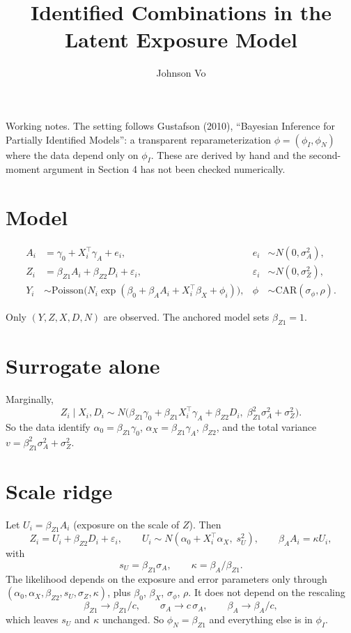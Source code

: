 \documentclass[11pt]{article}
\title{Identified Combinations in the Latent Exposure Model}
\author{Johnson Vo}
\date{}
\begin{document}
\maketitle

Working notes. The setting follows Gustafson (2010), ``Bayesian Inference for Partially Identified Models'': a transparent reparameterization $\phi = (\phi_I, \phi_N)$ where the data depend only on $\phi_I$. These are derived by hand and the second-moment argument in Section 4 has not been checked numerically.

\section{Model}

\begin{align*}
A_i &= \gamma_0 + X_i^\top \gamma_A + e_i, & e_i &\sim N(0, \sigma_A^2),\\
Z_i &= \beta_{Z1} A_i + \beta_{Z2} D_i + \varepsilon_i, & \varepsilon_i &\sim N(0, \sigma_Z^2),\\
Y_i &\sim \text{Poisson}\big(N_i \exp(\beta_0 + \beta_A A_i + X_i^\top \beta_X + \phi_i)\big), & \phi &\sim \text{CAR}(\sigma_\phi, \rho).
\end{align*}

Only $(Y, Z, X, D, N)$ are observed. The anchored model sets $\beta_{Z1} = 1$.

\section{Surrogate alone}

Marginally,
\[
Z_i \mid X_i, D_i \sim N\big(\beta_{Z1}\gamma_0 + \beta_{Z1} X_i^\top \gamma_A + \beta_{Z2} D_i,\; \beta_{Z1}^2 \sigma_A^2 + \sigma_Z^2\big).
\]
So the data identify $\alpha_0 = \beta_{Z1}\gamma_0$, $\alpha_X = \beta_{Z1}\gamma_A$, $\beta_{Z2}$, and the total variance $v = \beta_{Z1}^2\sigma_A^2 + \sigma_Z^2$.

\section{Scale ridge}

Let $U_i = \beta_{Z1} A_i$ (exposure on the scale of $Z$). Then
\[
Z_i = U_i + \beta_{Z2} D_i + \varepsilon_i, \qquad U_i \sim N(\alpha_0 + X_i^\top \alpha_X,\; s_U^2), \qquad \beta_A A_i = \kappa U_i,
\]
with
\[
s_U = \beta_{Z1}\sigma_A, \qquad \kappa = \beta_A / \beta_{Z1}.
\]
The likelihood depends on the exposure and error parameters only through $(\alpha_0, \alpha_X, \beta_{Z2}, s_U, \sigma_Z, \kappa)$, plus $\beta_0$, $\beta_X$, $\sigma_\phi$, $\rho$. It does not depend on the rescaling
\[
\beta_{Z1} \to \beta_{Z1}/c, \qquad \sigma_A \to c\,\sigma_A, \qquad \beta_A \to \beta_A/c,
\]
which leaves $s_U$ and $\kappa$ unchanged. So $\phi_N = \beta_{Z1}$ and everything else is in $\phi_I$.
\end{document}
